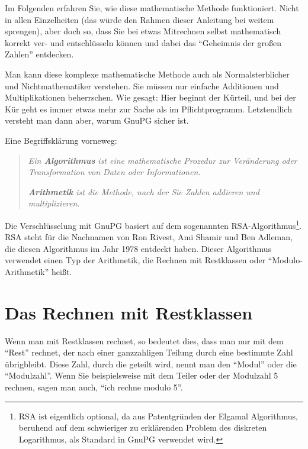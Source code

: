 \documentclass[a4paper,11pt, oneside,openright,titlepage,dvips]{scrbook}
\newcounter{chapter}
\newcounter{section}[chapter]
\begin{document}
\clearpage

Im Folgenden erfahren Sie, wie diese mathematische Methode funktioniert. Nicht
in allen Einzelheiten (das würde den Rahmen dieser Anleitung bei
weitem sprengen), aber doch so, dass Sie bei etwas Mitrechnen selbst
mathematisch korrekt ver- und entschlüsseln können und dabei das
"`Geheimnis der großen Zahlen"' entdecken.

Man kann diese komplexe mathematische Methode auch als
Normalsterblicher und Nichtmathematiker verstehen. Sie müssen nur
einfache Additionen und Multiplikationen beherrschen. Wie gesagt: Hier
beginnt der Kürteil, und bei der Kür geht es immer etwas mehr zur
Sache als im Pflichtprogramm.  Letztendlich versteht man dann aber,
warum GnuPG sicher ist.

Eine Begriffsklärung vorneweg:

\begin{quote}

    \textit{Ein \textbf{Algorithmus} ist eine mathematische Prozedur zur Veränderung oder
    Transformation von Daten oder Informationen.}

    \textit{\textbf{Arithmetik} ist die Methode, nach der Sie Zahlen addieren und
    multiplizieren.}
\end{quote}


Die Verschlüsselung mit GnuPG basiert auf dem sogenannten
RSA-Algorithmus\footnote{RSA ist eigentlich optional, da aus
  Patentgründen der Elgamal Algorithmus, beruhend auf dem schwieriger
  zu erklärenden Problem des diskreten Logarithmus, als Standard in
  GnuPG verwendet wird.}.  RSA steht für die Nachnamen von Ron Rivest, Ami
Shamir und Ben Adleman, die diesen Algorithmus im Jahr 1978 entdeckt
haben. Dieser Algorithmus verwendet einen Typ der Arithmetik, die
Rechnen mit Restklassen oder "`Modulo-Arithmetik"' heißt.

\clearpage
\section{Das Rechnen mit Restklassen}

Wenn man mit Restklassen rechnet, so bedeutet dies, dass man
nur mit dem "`Rest"' rechnet, der nach einer ganzzahligen Teilung durch eine
bestimmte Zahl übrigbleibt. Diese Zahl, durch die geteilt wird,
nennt man den "`Modul"' oder die "`Modulzahl"'. Wenn Sie
beispielsweise mit dem Teiler oder der Modulzahl 5 rechnen,
sagen man auch, "`ich rechne modulo 5"'.
\end{document}
